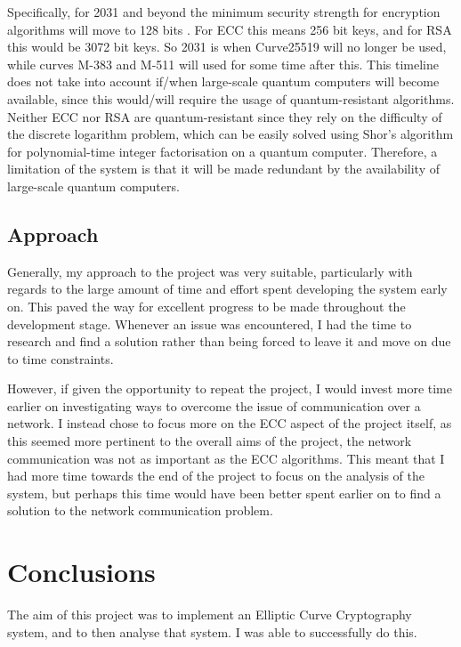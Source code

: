 \documentclass[12pt,a4paper]{article}
\begin{document}
Specifically, for 2031 and beyond the minimum security strength for encryption algorithms will move to 128 bits \cite[p59]{barker2020recommendation}. 
For ECC this means 256 bit keys, and for RSA this would be 3072 bit keys. 
So 2031 is when Curve25519 will no longer be used, while curves M-383 and M-511 will used for some time after this. 
This timeline does not take into account if/when large-scale quantum computers will become available, 
since this would/will require the usage of quantum-resistant algorithms. 
Neither ECC nor RSA are quantum-resistant since they rely on the difficulty of the discrete logarithm problem, 
which can be easily solved using Shor's algorithm for polynomial-time integer factorisation on a quantum computer. 
Therefore, a limitation of the system is that it will be made redundant by the availability of large-scale quantum computers. 


\subsection{Approach} \noindent \label{Approach}
Generally, my approach to the project was very suitable, particularly with regards to the large amount of time and effort spent developing the system early on. 
This paved the way for excellent progress to be made throughout the development stage. 
Whenever an issue was encountered, I had the time to research and find a solution rather than being forced to leave it and move on due to time constraints. 

However, if given the opportunity to repeat the project, I would invest more time earlier on investigating ways to overcome the issue of communication over a network. 
I instead chose to focus more on the ECC aspect of the project itself, as this seemed more pertinent to the overall aims of the project, the network communication was not as important as the ECC algorithms. 
This meant that I had more time towards the end of the project to focus on the analysis of the system, 
but perhaps this time would have been better spent earlier on to find a solution to the network communication problem. 



\section{Conclusions} \noindent
The aim of this project was to implement an Elliptic Curve Cryptography system, 
and to then analyse that system. 
I was able to successfully do this. 
\end{document}

